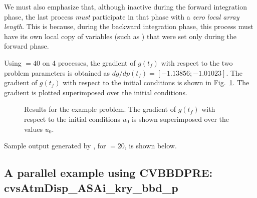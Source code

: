 We must also emphasize that, although inactive during the forward integration phase, 
the last process {\em must} participate in that phase with a 
{\em zero local array length}. 
This is because, during the backward integration phase, this process must
have its own local copy of variables (such as ) that were set
only during the forward phase.

Using  $=40$ on 4 processes, the gradient of $g(t_f)$ with respect to 
the two problem parameters is obtained as $dg/dp(t_f) = [ -1.13856; -1.01023]$.
The gradient of $g(t_f)$ with respect to the initial conditions is shown in
Fig.~\ref{f:cvsAdvDiff_ASAp_non_p}. The gradient is plotted superimposed over the
initial conditions.
\begin{figure}
  {\centerline{}}
  \caption{Results for the  example problem.
    The gradient of $g(t_f)$ with respect to the initial conditions $u_0$ 
    is shown superimposed over the values $u_0$.}
  \label{f:cvsAdvDiff_ASAp_non_p}
\end{figure}
Sample output generated by , for  $=20$, is
shown below.




\subsection{A parallel example using CVBBDPRE: cvsAtmDisp\_ASAi\_kry\_bbd\_p}
\label{ss:cvsAtmDisp_ASAi_kry_bbd_p}

